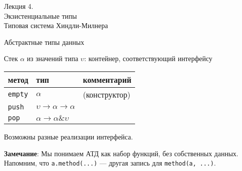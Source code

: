 \documentclass[aspectratio=169]{beamer}
\begin{document}
\newtheorem{dfn}{Определение}[section]
\newtheorem{nte}{Замечание}[section]

\newtheorem{axiom}{Аксиома}[section]
\newtheorem{thm}{Теорема}[section]
\newtheorem{lmm}[theorem]{Лемма}
\newtheorem{statement}{Утверждение}[section]
\newtheorem{oun_paragraph}{Пункт}[section]
\newtheorem{cons}{Следствие}[section]
\newtheorem*{exm}{Пример}

\newcommand{\comb}[1]{\operatorname{\bf{\textrm{#1}}}}
\newcommand{\func}[1]{\operatorname{#1}}
\newcommand{\reduction}[1]{{\color{OrangeRed}#1}}
\newcommand{\set}[1]{\left\{#1\right\}}

\def\from#1{\par \parbox{0.7\textwidth}{\par \hfill\raggedleft \it #1}} 

\begin{frame}{}
\begin{center}\Large Лекция 4.\\ \Large Экзистенциальные типы \\ Типовая система Хиндли-Милнера\end{center}
\end{frame}

\begin{frame}[fragile]{Абстрактные типы данных}

	Стек $\alpha$ из значений типа $\upsilon$: контейнер, соответствующий интерфейсу

	\begin{center}\begin{tabular}{lll}
	метод & тип & комментарий\\\hline
	\verb!empty! & $\alpha$ & (конструктор)\\
	\verb!push! & $\upsilon \rightarrow \alpha \rightarrow \alpha$\\
	\verb!pop! & $\alpha \rightarrow \alpha \& \upsilon$
	\end{tabular}\end{center}

	Возможны разные реализации интерфейса.\vspace{0.5cm}

	\textbf{Замечание}:  Мы понимаем АТД как набор функций, без собственных данных.
	Напомним, что \verb!a.method(...)! --- другая запись для \verb!method(a, ...)!.
\end{frame}
\end{document}
